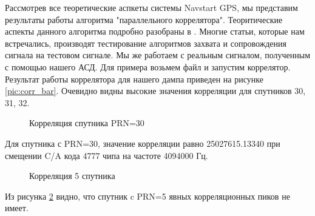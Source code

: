 \documentclass[a4paper,12pt]{article}
\numberwithin{table}{section}
\begin{document}
Рассмотрев все теоретические аспкеты системы Navstart GPS, мы представим результаты работы алгоритма "параллельного коррелятора".
Теоритические аспекты данного алгоритма подробно разобраны в \cite{tsui, akos-book}. Многие статьи, которые нам встречались,
производят тестирование алгоритмов захвата и сопровождения сигнала на тестовом сигнале. Мы же работаем с реальным сигналом,
полученным с помощью нашего АСД. Для примера возьмем файл и запустим коррелятор. Результат работы коррелятора для нашего
дампа приведен на рисунке \ref{pic:corr_bar}. Очевидно видны высокие значения корреляции для спутников 30, 31, 32.
\begin{figure}[h]
\begin{center}
\end{center}
\caption{Корреляция спутника PRN=30}
\label{pic:corr_30}
\end{figure}
Для спутника с PRN=30, значение корреляции равно 25027615.13340 при смещении C/A кода 4777 чипа на частоте 4094000 Гц.
%
%

\begin{figure}[h]
\begin{center}
\end{center}
\caption{Корреляция 5 спутника}
\label{pic:corr_5}
\end{figure}
Из рисунка \ref{pic:corr_5} видно, что спутник c PRN=5 явных корреляционных пиков не имеет.
\end{document}
